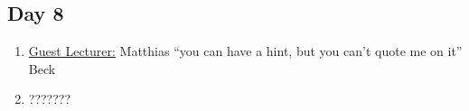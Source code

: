 \subsection{Day 8}
    \begin{enumerate}
        \item \underline{Guest Lecturer:} Matthias ``you can have a hint, but you can't quote me on it'' Beck
        \item ???????
    \end{enumerate}
